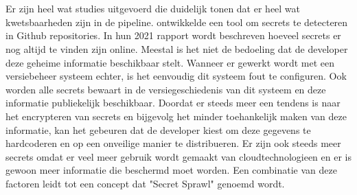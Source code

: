 \section{}%
\label{sec:Kwetsbaarheden en aanvallen om secrets te extraheren}

\subsection{}
\label{sec:Secret Sprawl}
Er zijn heel wat studies uitgevoerd die duidelijk tonen dat er heel wat kwetsbaarheden zijn in de pipeline. \autocite{GitGuardian2021} ontwikkelde een tool om secrets te detecteren in Github repositories. In hun 2021 rapport wordt beschreven hoeveel secrets er nog altijd te vinden zijn online. Meestal is het niet de bedoeling dat de developer deze geheime informatie beschikbaar stelt. Wanneer er gewerkt wordt met een versiebeheer systeem echter, is het eenvoudig dit systeem fout te configuren. Ook worden alle secrets bewaart in de versiegeschiedenis van dit systeem en deze informatie publiekelijk beschikbaar. Doordat er steeds meer een tendens is naar het encrypteren van secrets en bijgevolg het minder toehankelijk maken van deze informatie, kan het gebeuren dat de developer kiest om deze gegevens te hardcoderen en op een onveilige manier te distribueren. Er zijn ook steeds meer secrets omdat er veel meer gebruik wordt gemaakt van cloudtechnologieen en er is gewoon meer informatie die beschermd moet worden. Een combinatie van deze factoren leidt tot een concept dat "Secret Sprawl" genoemd wordt.\autocite{GitGuardian2021}

